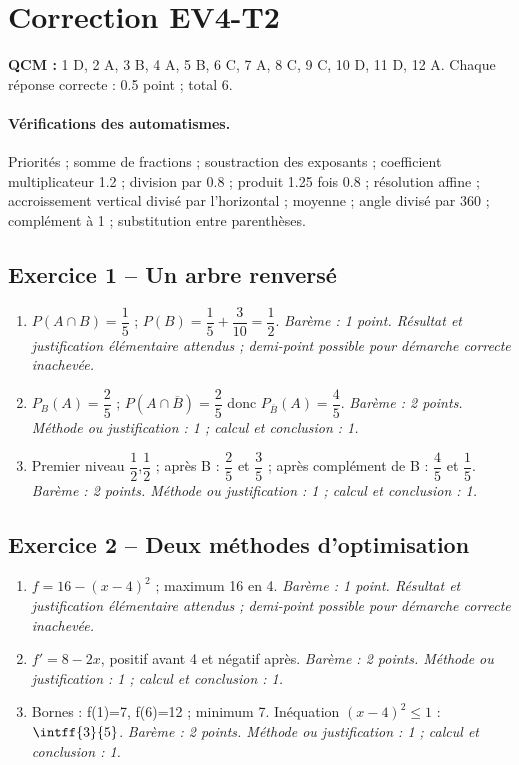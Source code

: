 \mxnewpage\section*{Correction EV4-T2}\label{EV4-T2-CORR}
\textbf{QCM :} 1 D, 2 A, 3 B, 4 A, 5 B, 6 C, 7 A, 8 C, 9 C, 10 D, 11 D, 12 A. Chaque réponse correcte : \num{0,5} point ; total 6.
\paragraph{Vérifications des automatismes.} Priorités ; somme de fractions ; soustraction des exposants ; coefficient multiplicateur \num{1,2} ; division par \num{0,8} ; produit \num{1,25} fois \num{0,8} ; résolution affine ; accroissement vertical divisé par l’horizontal ; moyenne ; angle divisé par 360 ; complément à 1 ; substitution entre parenthèses.
\subsection*{Exercice 1 -- Un arbre renversé}
\begin{enumerate}
\item $P(A\cap B)=\dfrac{1}{5}$ ; $P(B)=\dfrac{1}{5}+\dfrac{3}{10}=\dfrac{1}{2}$. \textit{Barème : 1 point. Résultat et justification élémentaire attendus ; demi-point possible pour démarche correcte inachevée.}
\item $P_B(A)=\dfrac{2}{5}$ ; $P(A\cap\overline B)=\dfrac{2}{5}$ donc $P_{\overline B}(A)=\dfrac{4}{5}$. \textit{Barème : 2 points. Méthode ou justification : 1 ; calcul et conclusion : 1.}
\item Premier niveau $\dfrac{1}{2}$,$\dfrac{1}{2}$ ; après B : $\dfrac{2}{5}$ et $\dfrac{3}{5}$ ; après complément de B : $\dfrac{4}{5}$ et $\dfrac{1}{5}$. \textit{Barème : 2 points. Méthode ou justification : 1 ; calcul et conclusion : 1.}
\end{enumerate}
\subsection*{Exercice 2 -- Deux méthodes d’optimisation}
\begin{enumerate}
\item $f=16-(x-4)^2$ ; maximum 16 en 4. \textit{Barème : 1 point. Résultat et justification élémentaire attendus ; demi-point possible pour démarche correcte inachevée.}
\item $f\prime=8-2x$, positif avant 4 et négatif après. \textit{Barème : 2 points. Méthode ou justification : 1 ; calcul et conclusion : 1.}
\item Bornes : f(1)=7, f(6)=12 ; minimum 7. Inéquation $(x-4)^2\leq1$ : $\intff{3}{5}$. \textit{Barème : 2 points. Méthode ou justification : 1 ; calcul et conclusion : 1.}
\end{enumerate}
